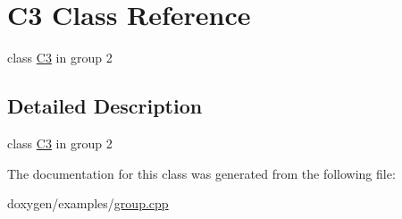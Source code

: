 \hypertarget{class_c3}{}\section{C3 Class Reference}
\label{class_c3}


class \mbox{\hyperlink{class_c3}{C3}} in group 2  




\subsection{Detailed Description}
class \mbox{\hyperlink{class_c3}{C3}} in group 2 

The documentation for this class was generated from the following file\+:\begin{DoxyCompactItemize}
\item 
doxygen/examples/\mbox{\hyperlink{group_8cpp}{group.\+cpp}}\end{DoxyCompactItemize}
